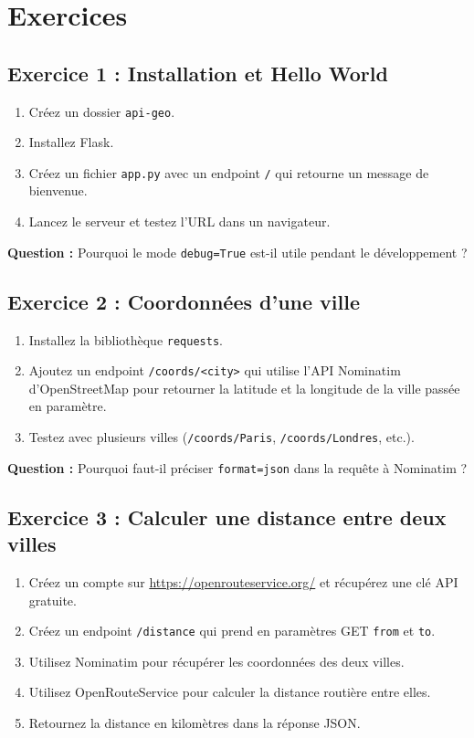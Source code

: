 \documentclass[a4paper,12pt]{article}
\begin{document}
\section*{Exercices}

\subsection*{Exercice 1 : Installation et Hello World}

\begin{enumerate}
    \item Créez un dossier \texttt{api-geo}.
    \item Installez Flask.
    \item Créez un fichier \texttt{app.py} avec un endpoint \texttt{/} qui retourne un message de bienvenue.
    \item Lancez le serveur et testez l’URL dans un navigateur.
\end{enumerate}

\textbf{Question :} Pourquoi le mode \texttt{debug=True} est-il utile pendant le développement ?

\subsection*{Exercice 2 : Coordonnées d’une ville}

\begin{enumerate}
    \item Installez la bibliothèque \texttt{requests}.
    \item Ajoutez un endpoint \texttt{/coords/<city>} qui utilise l’API Nominatim d’OpenStreetMap pour retourner la latitude et la longitude de la ville passée en paramètre.
    \item Testez avec plusieurs villes (\texttt{/coords/Paris}, \texttt{/coords/Londres}, etc.).
\end{enumerate}

\textbf{Question :} Pourquoi faut-il préciser \texttt{format=json} dans la requête à Nominatim ?

\subsection*{Exercice 3 : Calculer une distance entre deux villes}

\begin{enumerate}
    \item Créez un compte sur \url{https://openrouteservice.org/} et récupérez une clé API gratuite.
    \item Créez un endpoint \texttt{/distance} qui prend en paramètres GET \texttt{from} et \texttt{to}.
    \item Utilisez Nominatim pour récupérer les coordonnées des deux villes.
    \item Utilisez OpenRouteService pour calculer la distance routière entre elles.
    \item Retournez la distance en kilomètres dans la réponse JSON.
\end{enumerate}
\end{document}
